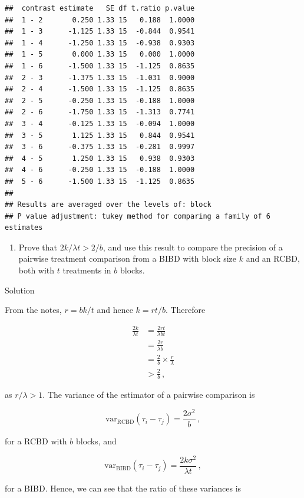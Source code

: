 \documentclass[
]{book}
\providecommand{\tightlist}{%
  \setlength{\itemsep}{0pt}\setlength{\parskip}{0pt}}
\theoremstyle{definition}
\theoremstyle{definition}
\theoremstyle{definition}
\theoremstyle{definition}
\theoremstyle{remark}
\begin{document}
\begin{enumerate}
\begin{verbatim}
##  contrast estimate   SE df t.ratio p.value
##  1 - 2       0.250 1.33 15   0.188  1.0000
##  1 - 3      -1.125 1.33 15  -0.844  0.9541
##  1 - 4      -1.250 1.33 15  -0.938  0.9303
##  1 - 5       0.000 1.33 15   0.000  1.0000
##  1 - 6      -1.500 1.33 15  -1.125  0.8635
##  2 - 3      -1.375 1.33 15  -1.031  0.9000
##  2 - 4      -1.500 1.33 15  -1.125  0.8635
##  2 - 5      -0.250 1.33 15  -0.188  1.0000
##  2 - 6      -1.750 1.33 15  -1.313  0.7741
##  3 - 4      -0.125 1.33 15  -0.094  1.0000
##  3 - 5       1.125 1.33 15   0.844  0.9541
##  3 - 6      -0.375 1.33 15  -0.281  0.9997
##  4 - 5       1.250 1.33 15   0.938  0.9303
##  4 - 6      -0.250 1.33 15  -0.188  1.0000
##  5 - 6      -1.500 1.33 15  -1.125  0.8635
## 
## Results are averaged over the levels of: block 
## P value adjustment: tukey method for comparing a family of 6 estimates
\end{verbatim}
\end{enumerate}

\begin{enumerate}
\def\labelenumi{\arabic{enumi}.}
\setcounter{enumi}{2}
\tightlist
\item
  Prove that \(2k/\lambda t > 2/b\), and use this result to compare the precision of a pairwise treatment comparison from a BIBD with block size \(k\) and an RCBD, both with \(t\) treatments in \(b\) blocks.
\end{enumerate}

Solution

From the notes, \(r = bk / t\) and hence \(k = rt / b\). Therefore

\begin{align*}
\frac{2k}{\lambda t} & = \frac{2rt}{\lambda b t} \\
& = \frac{2r}{\lambda b} \\
& = \frac{2}{b}\times\frac{r}{\lambda} \\
& > \frac{2}{b}\,,
\end{align*}

as \(r / \lambda > 1\). The variance of the estimator of a pairwise comparison is

\[
\mbox{var}_{\mbox{RCBD}}\left(\tau_i - \tau_j\right) = \frac{2\sigma^2}{b}\,,
\]

for a RCBD with \(b\) blocks, and

\[
\mbox{var}_{\mbox{BIBD}}\left(\tau_i - \tau_j\right) = \frac{2k\sigma^2}{\lambda t}\,,
\]

for a BIBD. Hence, we can see that the ratio of these variances is
\end{document}
